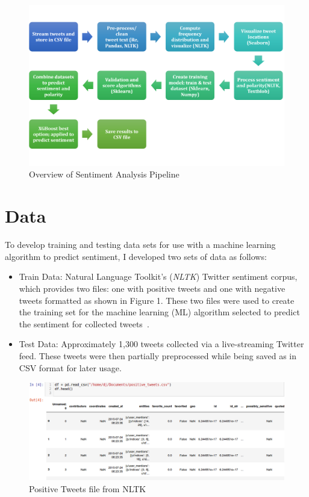 \begin{figure}[H]
\centering
\includegraphics[width=\columnwidth]{images/sentiment_analysis_pipeline.png}
\caption{Overview of Sentiment Analysis Pipeline}
\label{fig:pipeline}
\end{figure}

\section{Data} 

To develop training and testing data sets for use
with a machine learning algorithm to predict
sentiment, I developed two sets of data as follows:

\begin{itemize}
\item Train Data:  Natural Language Toolkit's
(\emph{NLTK}) Twitter sentiment corpus, which
provides two files:  one with positive tweets and one
with negative tweets formatted as shown in Figure 1.
These two files were used to create the training set
for the machine learning (ML) algorithm selected to
predict the sentiment for collected tweets~\cite{twitter14}.

\item Test Data:  Approximately 1,300 tweets collected via a
live-streaming Twitter feed.  These tweets were then partially
preprocessed while being saved as in CSV format for later usage.
\end{itemize}

\begin{figure}[H]
\centering
\includegraphics[width=\columnwidth]{images/screenshot_positive.png}
\caption{Positive Tweets file from NLTK}
\label{fig:positive}
\end{figure} 

